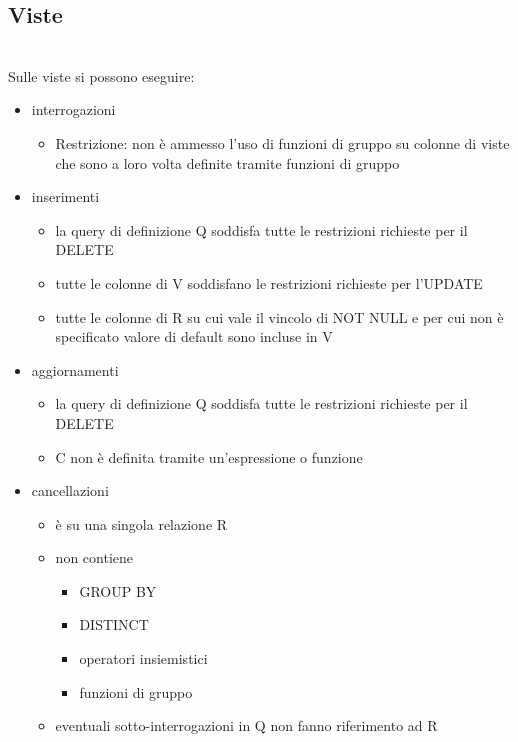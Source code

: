 \subsection{Viste}
\vspace{4mm} \\
Sulle viste si possono eseguire:
\begin{itemize}
    \item interrogazioni
    \begin{itemize}
        \item Restrizione: non è ammesso l’uso di funzioni di gruppo su colonne di viste che sono a loro volta definite tramite funzioni di gruppo
    \end{itemize}
    
    \item inserimenti
    \begin{itemize}
        \item la query di definizione Q soddisfa tutte le restrizioni richieste per il DELETE
        \item tutte le colonne di V soddisfano le restrizioni richieste per l’UPDATE
        \item tutte le colonne di R su cui vale il vincolo di NOT NULL e per cui non è specificato valore di default sono incluse in V
    \end{itemize}
    
    \item aggiornamenti
    \begin{itemize}
        \item la query di definizione Q soddisfa tutte le restrizioni richieste per il DELETE
        \item C non è definita tramite un’espressione o funzione
    \end{itemize}
    
    \item cancellazioni
    \begin{itemize}
        \item è su una singola relazione R
        \item non contiene
        \begin{itemize}
            \item GROUP BY
            \item DISTINCT
            \item operatori insiemistici
            \item funzioni di gruppo
        \end{itemize}
        \item eventuali sotto-interrogazioni in Q non fanno riferimento ad R
    \end{itemize}
\end{itemize}

